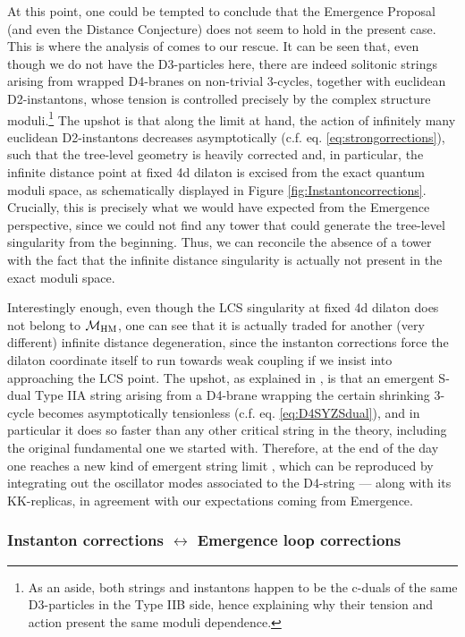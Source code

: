 At this point, one could be tempted to conclude that the Emergence Proposal (and even the Distance Conjecture) does not seem to hold in the present case. This is where the analysis of \cite{Baume:2019sry,Alvarez-Garcia:2021pxo} comes to our rescue. It can be seen that, even though we do not have the D3-particles here, there are indeed solitonic strings arising from wrapped D4-branes on non-trivial 3-cycles, together with euclidean D2-instantons, whose tension is controlled precisely by the complex structure moduli.\footnote{As an aside, both strings and instantons happen to be the c-duals of the same D3-particles in the Type IIB side, hence explaining why their tension and action present the same moduli dependence.} The upshot is that along the limit at hand, the action of infinitely many euclidean D2-instantons decreases asymptotically (c.f. eq. \eqref{eq:strongorrections}), such that the tree-level geometry is heavily corrected and, in particular, the infinite distance point at fixed 4d dilaton is excised from the exact quantum moduli space, as schematically displayed in Figure \ref{fig:Instantoncorrections}. Crucially, this is precisely what we would have expected from the Emergence perspective, since we could not find any tower that could generate the tree-level singularity from the beginning. Thus, we can reconcile the absence of a tower with the fact that the infinite distance singularity is actually not present in the exact moduli space.
		
Interestingly enough, even though the LCS singularity at fixed 4d dilaton does not belong to ${\cal M}_{\rm HM}$, one can see that it is actually traded for another (very different) infinite distance degeneration, since the instanton corrections force the dilaton coordinate itself to run towards weak coupling if we insist into approaching the LCS point. The upshot, as explained in \cite{Alvarez-Garcia:2021pxo}, is that an emergent S-dual Type IIA string arising from a D4-brane wrapping the certain shrinking 3-cycle becomes asymptotically tensionless (c.f. eq. \eqref{eq:D4SYZSdual}), and in particular it does so faster than any other critical string in the theory, including the original fundamental one we started with. Therefore, at the end of the day one reaches a new kind of emergent string limit \cite{Lee:2019wij}, which can be reproduced by integrating out the oscillator modes associated to the D4-string --- along with its KK-replicas, in agreement with our expectations coming from Emergence. 
		
		
\subsubsection*{Instanton corrections $\longleftrightarrow$ Emergence loop corrections}
		

